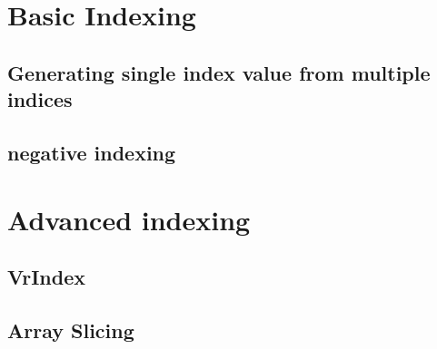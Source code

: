 \section{Basic Indexing}
\subsection{ Generating single index value from multiple indices}
\subsection{negative indexing}
\section{Advanced indexing}
\subsection{VrIndex}
\subsection{Array Slicing}

